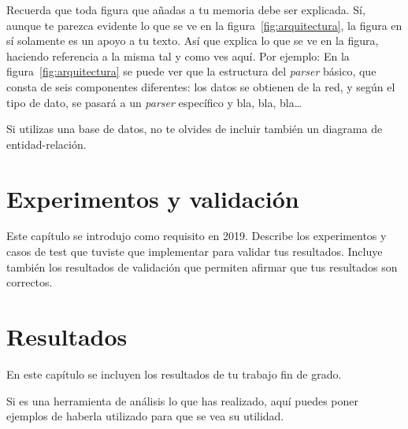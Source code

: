 \documentclass[a4paper, 12pt]{book}
\begin{document}
 
Recuerda que toda figura que añadas a tu memoria debe ser explicada.
Sí, aunque te parezca evidente lo que se ve en la figura~\ref{fig:arquitectura}, la figura en sí solamente es un apoyo a tu texto.
Así que explica lo que se ve en la figura, haciendo referencia a la misma tal y como ves aquí.
Por ejemplo: En la figura~\ref{fig:arquitectura} se puede ver que la estructura del \emph{parser} básico, que consta de seis componentes diferentes: los datos se obtienen de la red, y según el tipo de dato, se pasará a un \emph{parser} específico y bla, bla, bla\ldots

Si utilizas una base de datos, no te olvides de incluir también un diagrama de entidad-relación.



\cleardoublepage
\chapter{Experimentos y validación}

Este capítulo se introdujo como requisito en 2019. 
Describe los experimentos y casos de test que tuviste que implementar para validar tus resultados. 
Incluye también los resultados de validación que permiten afirmar que tus resultados son correctos. 



\cleardoublepage
\chapter{Resultados}

En este capítulo se incluyen los resultados de tu trabajo fin de grado.

Si es una herramienta de análisis lo que has realizado, aquí puedes poner ejemplos de haberla utilizado para que se vea su utilidad.


\end{document}

